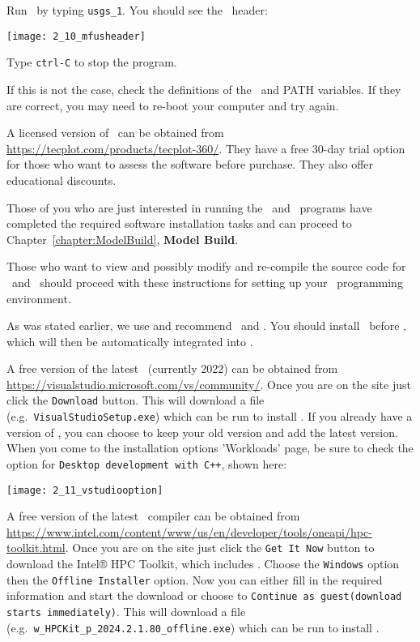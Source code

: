 Run \mfus\ by typing \texttt{usgs\_1}.  You should see the \mfus\ header:

    \texttt{[image: 2\_10\_mfusheader]}

Type \texttt{ctrl-C} to stop the program.

If this is not the case, check the definitions of the \bin\ and PATH variables.  If they are correct, you may need to re-boot your computer and try again.

A licensed version of \tecplot\ can be obtained from \url{https://tecplot.com/products/tecplot-360/}.  They have a free 30-day trial option for those who want to assess the software before purchase.  They also offer educational discounts.

Those of you who are just interested in running the \mut\ and \mfus\ programs have completed the required  software installation tasks and can proceed to Chapter~\ref{chapter:ModelBuild}, \textbf{Model Build}.

Those who want to view and possibly modify and re-compile the source code for \mut\ and \mfus\ should proceed with these instructions for setting up your \windows\ programming environment.

As was stated earlier, we use and recommend \vstudio\ and \ifort. You should install \vstudio\ before \ifort, which will then be automatically integrated into \vstudio.

A free version of the latest \vstudio\ (currently 2022) can be obtained from \url{https://visualstudio.microsoft.com/vs/community/}. Once you are on the site just click the \texttt{Download} button.  This will download a file (e.g.\ \texttt{VisualStudioSetup.exe}) which can be run to install \vstudio.  If you already have a version of \vstudio, you can choose to keep your old version and add the latest version.  When you come to the installation options 'Workloads' page, be sure to check the option for \texttt{Desktop development with C++}, shown here:

\texttt{[image: 2\_11\_vstudiooption]}

A free version of the latest \ifort\ compiler can be obtained from \url{https://www.intel.com/content/www/us/en/developer/tools/oneapi/hpc-toolkit.html}.
Once you are on the site just click the \texttt{Get It Now} button to download the Intel® HPC Toolkit, which includes \ifort.  Choose the \texttt{Windows} option then the \texttt{Offline Installer} option. Now you can either fill in the required information and start the download or choose to \texttt{Continue as guest(download starts immediately)}.  This will download a file (e.g.\ \texttt{w\_HPCKit\_p\_2024.2.1.80\_offline.exe}) which can be run to install \ifort.

